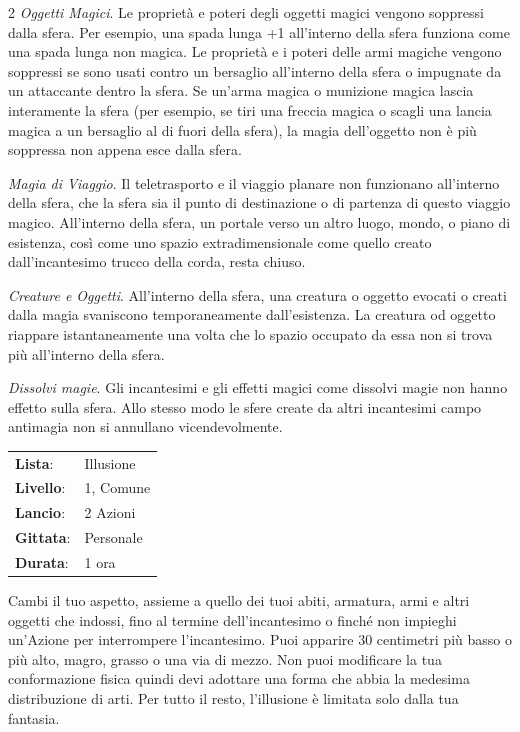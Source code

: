 \begin{multicols}{2}
\emph{Oggetti Magici}. Le proprietà e poteri degli oggetti magici vengono soppressi dalla sfera. Per esempio, una spada lunga +1 all'interno della sfera funziona come una spada lunga non magica. Le proprietà e i poteri delle armi magiche vengono soppressi se sono usati contro un bersaglio all'interno della sfera o impugnate da un attaccante dentro la sfera. Se un'arma magica o munizione magica lascia interamente la sfera (per esempio, se tiri una freccia magica o scagli una lancia magica a un bersaglio al di fuori della sfera), la magia dell'oggetto non è più soppressa non appena esce dalla sfera.

\emph{Magia di Viaggio}. Il teletrasporto e il viaggio planare non funzionano all'interno della sfera, che la sfera sia il punto di destinazione o di partenza di questo viaggio magico. All'interno della sfera, un portale verso un altro luogo, mondo, o piano di esistenza, così come uno spazio extradimensionale come quello creato dall'incantesimo trucco della corda, resta chiuso.

\emph{Creature e Oggetti}. All'interno della sfera, una creatura o oggetto evocati o creati dalla magia svaniscono temporaneamente dall'esistenza. La creatura od oggetto riappare istantaneamente una volta che lo spazio occupato da essa non si trova più all'interno della sfera.

\emph{Dissolvi magie}. Gli incantesimi e gli effetti magici come dissolvi magie non hanno effetto sulla sfera. Allo stesso modo le sfere create da altri incantesimi campo antimagia non si annullano vicendevolmente.

\noindent\begin{tabularx}{\linewidth}{p{1.9cm}X}
	\rowcolor{gray!20}\textbf{Lista}: & Illusione \\
	\textbf{Livello}: & 1, Comune \\
	\rowcolor{gray!20}\textbf{Lancio}: & 2 Azioni \\
	\textbf{Gittata}: & Personale \\
	\rowcolor{gray!20}\textbf{Durata}: & 1 ora \\
\end{tabularx}\smallskip

Cambi il tuo aspetto, assieme a quello dei tuoi abiti, armatura, armi e altri oggetti che indossi, fino al termine dell'incantesimo o finché non impieghi un'Azione per interrompere l'incantesimo. Puoi apparire 30 centimetri più basso o più alto, magro, grasso o una via di mezzo. Non puoi modificare la tua conformazione fisica quindi devi adottare una forma che abbia la medesima distribuzione di arti. Per tutto il resto, l'illusione è limitata solo dalla tua fantasia.


\end{multicols}
